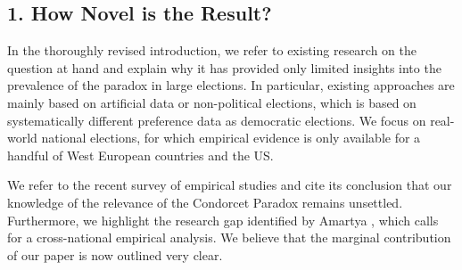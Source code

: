\documentclass[a4paper, 12pt]{scrartcl}
\begin{document}
\subsection*{1. How Novel is the Result?}
In the thoroughly revised introduction, we refer to existing research on the question at hand and explain why it has provided only limited insights into the prevalence of the paradox in large elections. In particular, existing approaches are mainly based on artificial data or non-political elections, which is based on systematically different preference data as democratic elections. We focus on real-world national elections, for which empirical evidence is only available for a handful of West European countries and the US.

We refer to the recent survey of empirical studies \citep{vanDeemen2013} and cite its conclusion that our knowledge of the relevance of the Condorcet Paradox remains unsettled. Furthermore, we highlight the research gap identified by Amartya \cite{Sen2017}, which calls for a cross-national empirical analysis. We believe that the marginal contribution of our paper is now outlined very clear.
\end{document}
